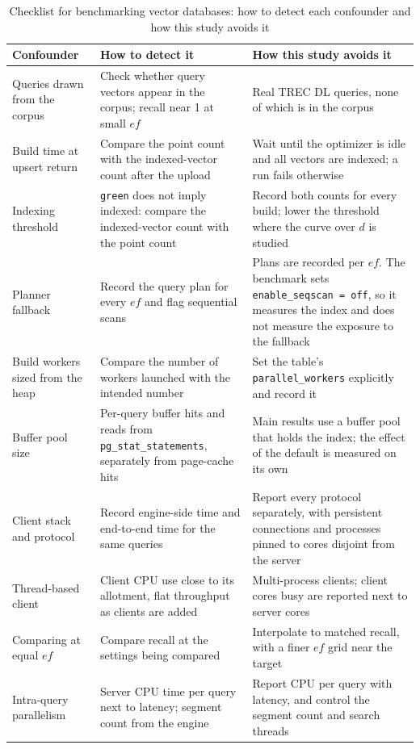 \documentclass[sigconf, nonacm]{acmart}
\begin{document}
\begin{table}[t]
  \caption{Checklist for benchmarking vector databases: how to detect each confounder and
  how this study avoids it}
  \label{tab:checklist}
  \small
  \begin{tabular}{p{}p{}p{}}
    \toprule
    Confounder & How to detect it & How this study avoids it \\
    \midrule
    Queries drawn from the corpus &
      Check whether query vectors appear in the corpus; recall near 1 at small $ef$ &
      Real TREC DL queries, none of which is in the corpus \\
    Build time at upsert return &
      Compare the point count with the indexed-vector count after the upload &
      Wait until the optimizer is idle and all vectors are indexed; a run fails
      otherwise \\
    Indexing threshold &
      \texttt{green} does not imply indexed: compare the indexed-vector count with the
      point count &
      Record both counts for every build; lower the threshold where the curve over $d$
      is studied \\
    Planner fallback &
      Record the query plan for every $ef$ and flag sequential scans &
      Plans are recorded per $ef$. The benchmark sets \texttt{enable\_seqscan = off}, so
      it measures the index and does not measure the exposure to the fallback \\
    Build workers sized from the heap &
      Compare the number of workers launched with the intended number &
      Set the table's \texttt{parallel\_workers} explicitly and record it \\
    Buffer pool size &
      Per-query buffer hits and reads from \texttt{pg\_stat\_statements}, separately from
      page-cache hits &
      Main results use a buffer pool that holds the index; the effect of the default is
      measured on its own \\
    Client stack and protocol &
      Record engine-side time and end-to-end time for the same queries &
      Report every protocol separately, with persistent connections and processes
      pinned to cores disjoint from the server \\
    Thread-based client &
      Client CPU use close to its allotment, flat throughput as clients are added &
      Multi-process clients; client cores busy are reported next to server cores \\
    Comparing at equal $ef$ &
      Compare recall at the settings being compared &
      Interpolate to matched recall, with a finer $ef$ grid near the target \\
    Intra-query parallelism &
      Server CPU time per query next to latency; segment count from the engine &
      Report CPU per query with latency, and control the segment count and search
      threads \\
    \bottomrule
  \end{tabular}
\end{table}
\end{document}
